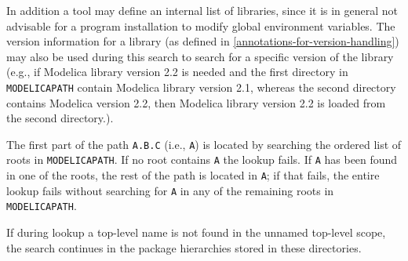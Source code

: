 In addition a tool may define an internal list of libraries, since it is in general not advisable for a program installation to modify global environment variables.
The version information for a library (as defined in \cref{annotations-for-version-handling}) may also be used during this search to search for a specific version of the library (e.g., if Modelica library version 2.2 is needed and the first directory in \lstinline!MODELICAPATH! contain Modelica library version 2.1, whereas the second directory contains Modelica version 2.2, then Modelica library version 2.2 is loaded from the second directory.).

\begin{nonnormative}
The first part of the path \lstinline!A.B.C! (i.e., \lstinline!A!) is located by searching the ordered list of roots in \lstinline!MODELICAPATH!.
If no root contains \lstinline!A! the lookup fails.
If \lstinline!A! has been found in one of the roots, the rest of the path is located in \lstinline!A!; if that fails, the entire lookup
fails without searching for \lstinline!A! in any of the remaining roots in \lstinline!MODELICAPATH!.
\end{nonnormative}

If during lookup a top-level name is not found in the unnamed top-level scope, the search continues in the package hierarchies stored in these directories.


